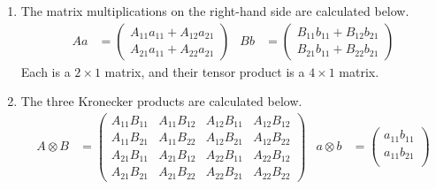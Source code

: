 \begin{answer}
\begin{enumerate}
\begin{align*}
			      \begin{pmatrix}
				      a_{11} \\ a_{21}
			      \end{pmatrix}
			      \right)
			              & \otimes
			      \left(
			      \begin{pmatrix}
				      B_{11} & B_{12} \\
				      B_{21} & B_{22}
			      \end{pmatrix}
			      \begin{pmatrix}
				      b_{11} \\ b_{21}
			      \end{pmatrix}
			      \right)
		      \end{align*}
		\item The matrix multiplications on the right-hand side are calculated below.
		      \begin{align*}
			      Aa & =
			      \begin{pmatrix}
				      A_{11} a_{11} + A_{12} a_{21} \\
				      A_{21} a_{11} + A_{22} a_{21}
			      \end{pmatrix}
			         &
			      Bb & =
			      \begin{pmatrix}
				      B_{11} b_{11} + B_{12} b_{21} \\
				      B_{21} b_{11} + B_{22} b_{21}
			      \end{pmatrix}
		      \end{align*}
		      Each is a $2 \times 1$ matrix, and their tensor product is a $4 \times 1$ matrix.
		\item The three Kronecker products are calculated below.
		      \begin{align*}
			      A \otimes B & =
			      \begin{pmatrix}
				      A_{11} B_{11} & A_{11} B_{12} & A_{12} B_{11} & A_{12} B_{12} \\
				      A_{11} B_{21} & A_{11} B_{22} & A_{12} B_{21} & A_{12} B_{22} \\
				      A_{21} B_{11} & A_{21} B_{12} & A_{22} B_{11} & A_{22} B_{12} \\
				      A_{21} B_{21} & A_{21} B_{22} & A_{22} B_{21} & A_{22} B_{22}
			      \end{pmatrix}
			                  &
			      a \otimes b & =
			      \begin{pmatrix}
				      a_{11} b_{11} \\
				      a_{11} b_{21} \\

\end{pmatrix}
\end{align*}
\end{enumerate}
\end{answer}
